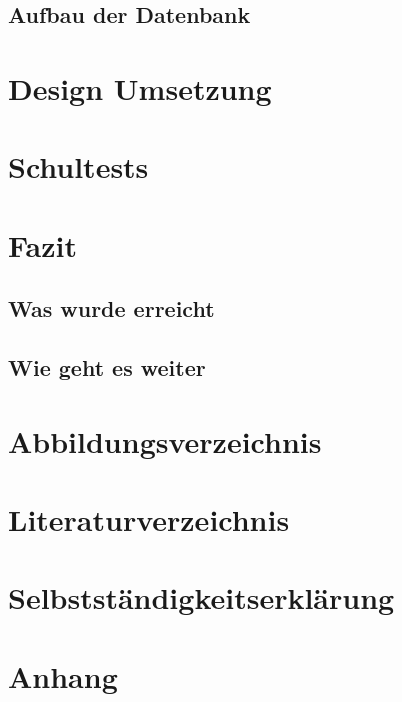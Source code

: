 \documentclass{article}
\begin{document}
\subsection{Aufbau der Datenbank}
\section{Design Umsetzung}

\section{Schultests}

\section{Fazit}
\subsection{Was wurde erreicht}
\subsection{Wie geht es weiter}
\cite{VeniceSpringer}

\section{Abbildungsverzeichnis}
\section{Literaturverzeichnis}
    
    
\section{Selbstständigkeitserklärung}
\section{Anhang}

\newpage
\end{document}
